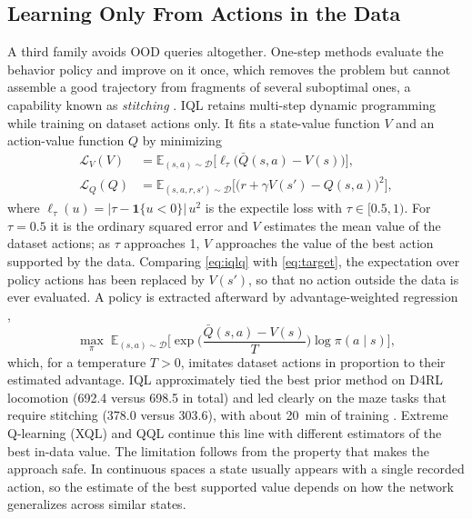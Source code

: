 \documentclass[journal]{IEEEtran}
\begin{document}
\subsection{Learning Only From Actions in the Data}
A third family avoids OOD queries altogether. One-step methods \cite{brandfonbrener2021onestep} evaluate the behavior policy and improve on it once, which removes the problem but cannot assemble a good trajectory from fragments of several suboptimal ones, a capability known as \emph{stitching} \cite{kostrikov2022iql}. IQL \cite{kostrikov2022iql} retains multi-step dynamic programming while training on dataset actions only. It fits a state-value function $V$ and an action-value function $Q$ by minimizing
\begin{align}
\mathcal{L}_V(V) &= \mathbb{E}_{(s,a) \sim \mathcal{D}}\big[\ell_\tau\big(\bar{Q}(s,a) - V(s)\big)\big], \label{eq:iqlv}\\
\mathcal{L}_Q(Q) &= \mathbb{E}_{(s,a,r,s') \sim \mathcal{D}}\big[\big(r + \gamma V(s') - Q(s,a)\big)^{2}\big], \label{eq:iqlq}
\end{align}
where $\ell_\tau(u) = |\tau - \mathbf{1}\{u < 0\}|\, u^{2}$ is the expectile loss with $\tau \in [0.5, 1)$. For $\tau = 0.5$ it is the ordinary squared error and $V$ estimates the mean value of the dataset actions; as $\tau$ approaches 1, $V$ approaches the value of the best action supported by the data. Comparing \eqref{eq:iqlq} with \eqref{eq:target}, the expectation over policy actions has been replaced by $V(s')$, so that no action outside the data is ever evaluated. A policy is extracted afterward by advantage-weighted regression \cite{peng2019awr},
\begin{equation}
\max_{\pi}\; \mathbb{E}_{(s,a) \sim \mathcal{D}}\Big[\exp\!\Big(\frac{\bar{Q}(s,a) - V(s)}{T}\Big) \log \pi(a \mid s)\Big],
\label{eq:awr}
\end{equation}
which, for a temperature $T > 0$, imitates dataset actions in proportion to their estimated advantage. IQL approximately tied the best prior method on D4RL locomotion (692.4 versus 698.5 in total) and led clearly on the maze tasks that require stitching (378.0 versus 303.6), with about 20~min of training \cite{kostrikov2022iql}. Extreme Q-learning (XQL) \cite{garg2023xql} and QQL \cite{gao2026qql} continue this line with different estimators of the best in-data value. The limitation follows from the property that makes the approach safe. In continuous spaces a state usually appears with a single recorded action, so the estimate of the best supported value depends on how the network generalizes across similar states.
\end{document}
